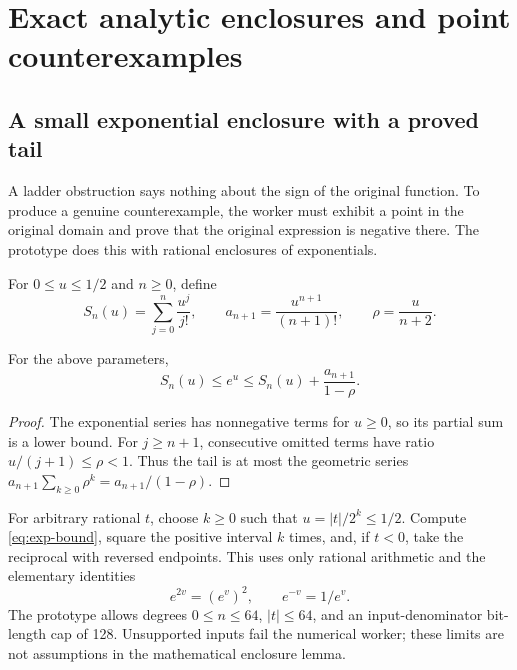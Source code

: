 \section{Exact analytic enclosures and point counterexamples}
\label{sec:enclosures}


\subsection{A small exponential enclosure with a proved tail}

A ladder obstruction says nothing about the sign of the original function. To produce a genuine counterexample, the worker must exhibit a point in the original domain and prove that the original expression is negative there. The prototype does this with rational enclosures of exponentials.

For $0\le u\le1/2$ and $n\ge0$, define
\[
 S_n(u)=\sum_{j=0}^n\frac{u^j}{j!},\qquad
 a_{n+1}=\frac{u^{n+1}}{(n+1)!},\qquad
 \rho=\frac{u}{n+2}.
\]

\begin{lemma}
\label{lem:exp-bound}
For the above parameters,
\begin{equation}
 S_n(u)\le e^u\le S_n(u)+\frac{a_{n+1}}{1-\rho}.
 \label{eq:exp-bound}
\end{equation}
\end{lemma}
\begin{proof}
The exponential series has nonnegative terms for $u\ge0$, so its partial sum is a lower bound. For $j\ge n+1$, consecutive omitted terms have ratio $u/(j+1)\le\rho<1$. Thus the tail is at most the geometric series $a_{n+1}\sum_{k\ge0}\rho^k=a_{n+1}/(1-\rho)$.
\end{proof}

For arbitrary rational $t$, choose $k\ge0$ such that $u=|t|/2^k\le1/2$. Compute \eqref{eq:exp-bound}, square the positive interval $k$ times, and, if $t<0$, take the reciprocal with reversed endpoints. This uses only rational arithmetic and the elementary identities
\[
 e^{2v}=(e^v)^2,\qquad e^{-v}=1/e^v.
\]
The prototype allows degrees $0\le n\le64$, $|t|\le64$, and an input-denominator bit-length cap of 128. Unsupported inputs fail the numerical worker; these limits are not assumptions in the mathematical enclosure lemma.

